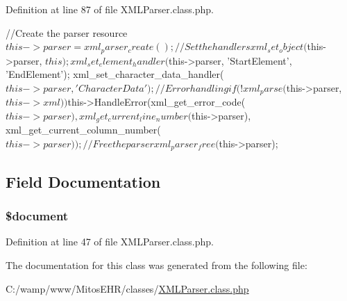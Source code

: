 \-Definition at line 87 of file \-X\-M\-L\-Parser.\-class.\-php.


\begin{DoxyCode}
    {
        //Create the parser resource
        $this->parser = xml_parser_create();
        
        //Set the handlers
        xml_set_object($this->parser, $this);
        xml_set_element_handler($this->parser, 'StartElement', 'EndElement');
        xml_set_character_data_handler($this->parser, 'CharacterData');

        //Error handling
        if (!xml_parse($this->parser, $this->xml))
            $this->HandleError(xml_get_error_code($this->parser), 
      xml_get_current_line_number($this->parser), xml_get_current_column_number($this->parser));

        //Free the parser
        xml_parser_free($this->parser);
    }
\end{DoxyCode}


\subsection{\-Field \-Documentation}
\hypertarget{class_x_m_l_parser_ac5a31edb787609a3143dec9bfa8063ea}{
\subsubsection[{\$document}]{\setlength{\rightskip}{0pt plus 5cm}\$document}}\label{class_x_m_l_parser_ac5a31edb787609a3143dec9bfa8063ea}


\-Definition at line 47 of file \-X\-M\-L\-Parser.\-class.\-php.



\-The documentation for this class was generated from the following file\-:\begin{DoxyCompactItemize}
\item 
\-C\-:/wamp/www/\-Mitos\-E\-H\-R/classes/\hyperlink{_x_m_l_parser_8class_8php}{\-X\-M\-L\-Parser.\-class.\-php}\end{DoxyCompactItemize}
